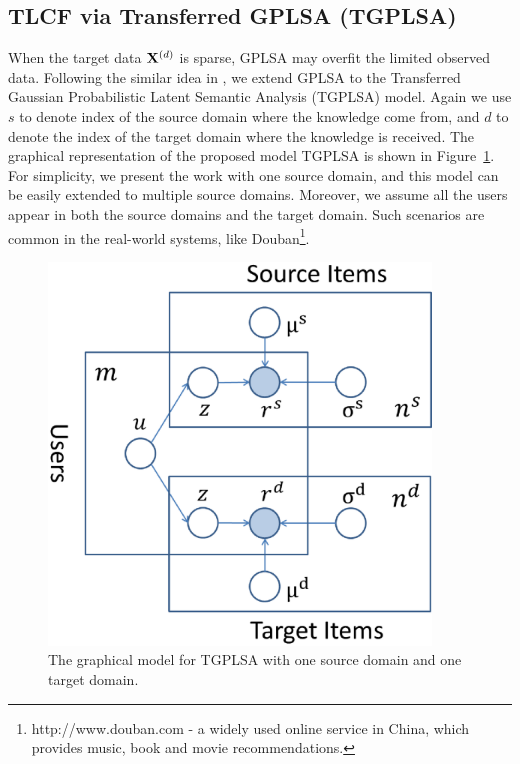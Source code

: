 \hspace{0.05in}
\subsection{TLCF via Transferred GPLSA (TGPLSA)}

When the target data $\mathbf{X}^{(d)}$ is sparse, GPLSA may overfit the limited observed data.
Following the similar idea in \cite{DBLP:conf/sigir/XueDYY08}, we extend GPLSA to the Transferred Gaussian Probabilistic Latent Semantic Analysis (TGPLSA) model. Again we use $s$ to denote index of the source domain where the knowledge come from, and $d$ to denote the index of the target domain where the knowledge is received. The graphical representation of the proposed model TGPLSA is shown in Figure~\ref{fig:gmodel1}.
For simplicity, we present the work with one source domain, and this model can be easily extended to multiple source domains. Moreover, we assume all the users appear in both the source domains and the target domain. Such scenarios are common in the real-world systems, like Douban\footnote{http://www.douban.com - a widely used online service in China, which provides music, book and movie recommendations.}.


\begin{figure}
\center
\includegraphics[width=4in]{fig/GM-TGPLSA}
\caption{The graphical model for TGPLSA with one source domain and one target domain.}\label{fig:gmodel1}
\end{figure}

